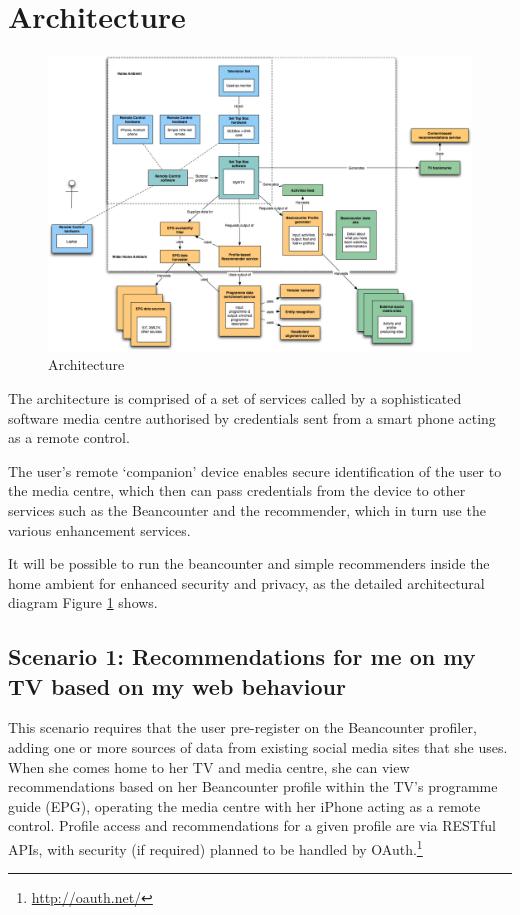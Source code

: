 \documentclass[]{article}%
\begin{document}
\section{Architecture}

\begin{figure}[htbp]
\begin{center}
\includegraphics[width=7in]{architecture.png}
\caption{Architecture} \label{fig:architecture}
\end{center}
\end{figure}

The architecture is comprised of a set of services called by a sophisticated software media centre authorised by credentials sent from a smart phone acting as a remote control.

The user's remote `companion' device enables secure identification of the user to the media centre, which then can pass credentials from the device to other services such as the Beancounter and the recommender, which in turn use the various enhancement services.

It will be possible to run the beancounter and simple recommenders inside the home ambient for enhanced security and privacy, as the detailed architectural diagram Figure \ref{fig:architecture} shows.

\subsection{Scenario 1: Recommendations for me on my TV based on my web behaviour}

This scenario requires that the user pre-register on the Beancounter profiler, adding one or more sources of data from existing social media sites that she uses. When she comes home to her TV and media centre, she can view recommendations based on her Beancounter profile within the TV's programme guide (EPG), operating the media centre with her iPhone acting as a remote control. Profile access and recommendations for a given profile are via RESTful APIs, with security (if required) planned to be handled by OAuth.\footnote{\url{http://oauth.net/}}
\end{document}
